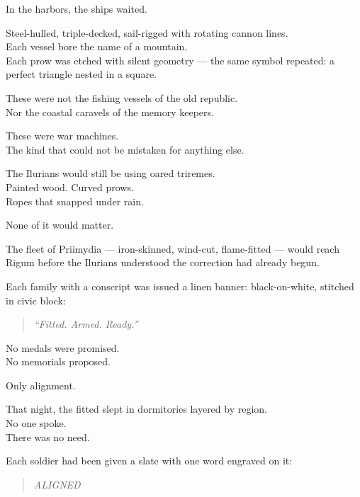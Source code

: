 \documentclass[12pt]{article}
\begin{document}
\vspace{1em}

In the harbors, the ships waited.

Steel-hulled, triple-decked, sail-rigged with rotating cannon lines.\\
Each vessel bore the name of a mountain.\\
Each prow was etched with silent geometry — the same symbol repeated: a perfect triangle nested in a square.

These were not the fishing vessels of the old republic.\\
Nor the coastal caravels of the memory keepers.

These were war machines.\\
The kind that could not be mistaken for anything else.

\vspace{1em}

The Ilurians would still be using oared triremes.\\
Painted wood. Curved prows.\\
Ropes that snapped under rain.

None of it would matter.

The fleet of Priimydia — iron-skinned, wind-cut, flame-fitted — would reach Rigum before the Ilurians understood the correction had already begun.

\vspace{1em}

Each family with a conscript was issued a linen banner: black-on-white, stitched in civic block:

\begin{quote}
\textit{“Fitted. Armed. Ready.”}
\end{quote}

No medals were promised.\\
No memorials proposed.

Only alignment.

\vspace{1em}

That night, the fitted slept in dormitories layered by region.\\
No one spoke.\\
There was no need.

Each soldier had been given a slate with one word engraved on it:

\begin{quote}
\textit{ALIGNED}
\end{quote}
\end{document}
